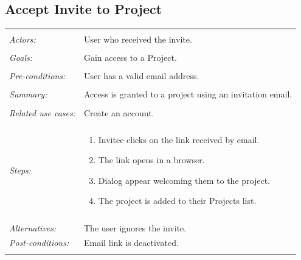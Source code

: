 \documentclass[11pt]{report}
\begin{document}
\subsection{Accept Invite to Project}
\begin{tabular}{ p{2cm} p{12cm} }   
 \hline
 \\
 \textit{Actors:} & User who received the invite. \\
 \\
 \textit{Goals:} & Gain access to a Project. \\
 \\
 \textit{Pre-conditions:} & User has a valid email address. \\
 \\
 \textit{Summary:} & Access is granted to a project using an invitation email. \\ 
 \\
 \textit{Related use cases:} & Create an account. \\
 \\
 \textit{Steps:} & \begin{enumerate}
  \item Invitee clicks on the link received by email.
	 \item The link opens in a browser.
	 \item Dialog appear welcoming them to the project.
	 \item The project is added to their Projects list.
	\end{enumerate} \\
 \\
 \textit{Alternatives:} & The user ignores the invite. \\
 \textit{Post-conditions:} & Email link is deactivated. \\
 \\
\hline
\end{tabular}
\end{document}
